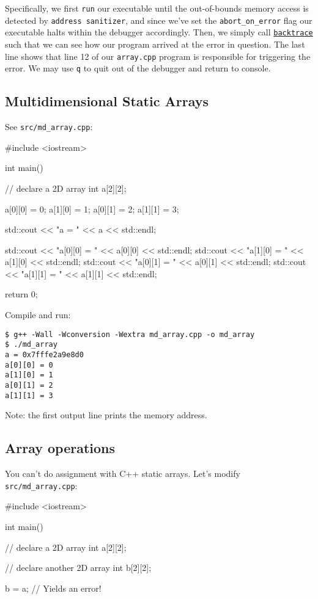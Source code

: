 \documentclass[12pt,letterpaper,twoside]{article}
\begin{document}
Specifically, we first \texttt{run} our
executable until the out-of-bounds memory access is detected by
\texttt{address sanitizer}, and since we've set the
\texttt{abort\_on\_error} flag our executable halts within the
debugger accordingly. Then, we simply call
\href{https://ftp.gnu.org/old-gnu/Manuals/gdb/html_node/gdb_42.html}{\texttt{backtrace}}
such that we can see how our program arrived at the error in question.
The last line shows that line 12 of our \texttt{array.cpp} program is
responsible for triggering the error. We may use \texttt{q} to quit
out of the debugger and return to console.

\subsection{Multidimensional Static Arrays}
See \texttt{src/md\_array.cpp}:

\begin{cpp}
#include <iostream>

int main() {
  // declare a 2D array
  int a[2][2];

  a[0][0] = 0;
  a[1][0] = 1;
  a[0][1] = 2;
  a[1][1] = 3;

  std::cout << "a = " << a << std::endl;

  std::cout << "a[0][0] = " << a[0][0] << std::endl;
  std::cout << "a[1][0] = " << a[1][0] << std::endl;
  std::cout << "a[0][1] = " << a[0][1] << std::endl;
  std::cout << "a[1][1] = " << a[1][1] << std::endl;

  return 0;
}
\end{cpp}

Compile and run:

{\footnotesize
\begin{verbatim}
$ g++ -Wall -Wconversion -Wextra md_array.cpp -o md_array
$ ./md_array
a = 0x7fffe2a9e8d0
a[0][0] = 0
a[1][0] = 1
a[0][1] = 2
a[1][1] = 3
\end{verbatim}
}

Note: the first output line prints the memory address.

\hypertarget{array-operations}{%
\subsection{Array operations}\label{array-operations}}

You can't do assignment with C++ static arrays. Let's modify
\texttt{src/md\_array.cpp}:

\begin{cpp}
#include <iostream>

int main() {
  // declare a 2D array
  int a[2][2];

  // declare another 2D array
  int b[2][2];

  b = a;   // Yields an error!
}
\end{cpp}
\end{document}

